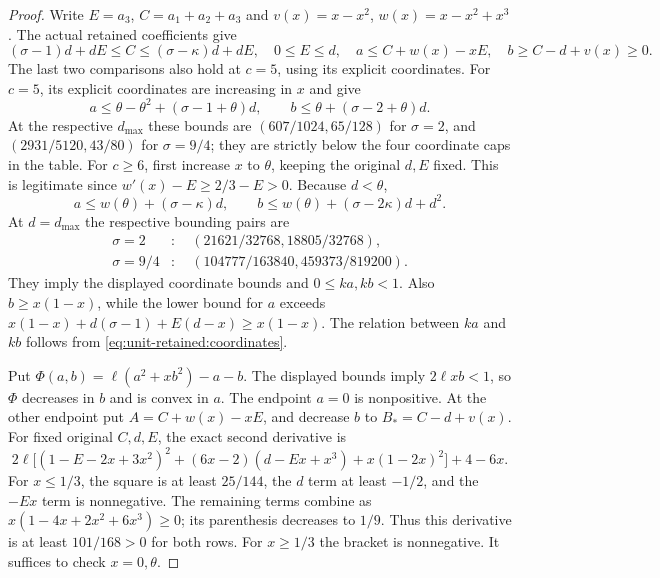 \begin{proof}
Write $E=a_3$, $C=a_1+a_2+a_3$ and $v(x)=x-x^2$, $w(x)=x-x^2+x^3$.
The actual retained coefficients give
\[
 (\sigma-1)d+dE\le C\le(\sigma-\kappa)d+dE,
 \quad 0\le E\le d,\quad
 a\le C+w(x)-xE,\quad b\ge C-d+v(x)\ge0.
\]
The last two comparisons also hold at $c=5$, using its explicit
coordinates. For $c=5$, its explicit coordinates are increasing in $x$ and give
\[
 a\le\theta-\theta^2+(\sigma-1+\theta)d,\qquad
 b\le\theta+(\sigma-2+\theta)d.
\]
At the respective $d_{\max}$ these bounds are
$(607/1024,65/128)$ for $\sigma=2$, and
$(2931/5120,43/80)$ for $\sigma=9/4$; they are strictly below
the four coordinate caps in the table.
For $c\ge6$, first increase $x$ to $\theta$, keeping the original
$d,E$ fixed. This is legitimate since
$w'(x)-E\ge2/3-E>0$. Because $d<\theta$,
\[
 a\le w(\theta)+(\sigma-\kappa)d,\qquad
 b\le w(\theta)+(\sigma-2\kappa)d+d^2.
\]
At $d=d_{\max}$ the respective bounding pairs are
\[
\begin{aligned}
 \sigma=2 &: \quad(21621/32768,18805/32768),\\
 \sigma=9/4 &: \quad(104777/163840,459373/819200).
\end{aligned}
\]
They imply the displayed coordinate bounds and $0\le ka,kb<1$.
Also $b\ge x(1-x)$, while the lower bound for $a$ exceeds
$x(1-x)+d(\sigma-1)+E(d-x)\ge x(1-x)$.
The relation between $ka$ and $kb$ follows from
\eqref{eq:unit-retained:coordinates}.

Put $\Phi(a,b)=\ell(a^2+xb^2)-a-b$. The displayed bounds imply
$2\ell xb<1$, so $\Phi$ decreases in $b$ and is convex in $a$.
The endpoint $a=0$ is nonpositive. At the other endpoint put
$A=C+w(x)-xE$, and decrease $b$ to $B_*=C-d+v(x)$. For fixed
original $C,d,E$, the exact second derivative is
\[
 2\ell\bigl[(1-E-2x+3x^2)^2
 +(6x-2)(d-Ex+x^3)+x(1-2x)^2\bigr]+4-6x.
\]
For $x\le1/3$, the square is at least $25/144$, the $d$ term at least
$-1/2$, and the $-Ex$ term is nonnegative. The remaining terms combine as
$x(1-4x+2x^2+6x^3)\ge0$; its parenthesis decreases to $1/9$.
Thus this derivative is at least $101/168>0$ for both rows.
For $x\ge1/3$ the bracket is nonnegative. It suffices to check
$x=0,\theta$.


\end{proof}
